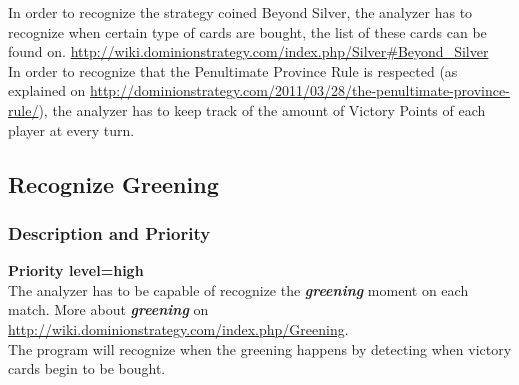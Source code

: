 \documentclass{scrreprt}
\begin{document}

In order to recognize the strategy coined Beyond Silver, the analyzer has to recognize when certain type of cards are bought, the list of these cards can be found on. \url{http://wiki.dominionstrategy.com/index.php/Silver#Beyond_Silver}\\

In order to recognize that the Penultimate Province Rule is respected (as explained on \url{http://dominionstrategy.com/2011/03/28/the-penultimate-province-rule/}), the analyzer has to keep track of the amount of Victory Points of each player at every turn.
\subsection{Recognize Greening}
\subsubsection{Description and Priority}
\textbf{Priority level=high}\\
The analyzer has to be capable of recognize the \textit{\textbf{greening}} moment on each match.
More about \textit{\textbf{greening}} on \url{http://wiki.dominionstrategy.com/index.php/Greening}.\\
The program will recognize when the greening happens by detecting when victory cards begin to be bought.
\end{document}
